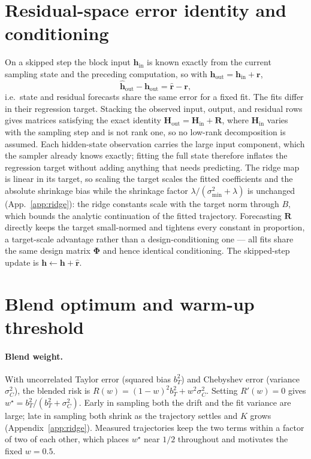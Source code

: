 \section{Residual-space error identity and conditioning}
\label{app:residual}

On a skipped step the block input $\mathbf{h}_{\mathrm{in}}$ is known
exactly from the current sampling state and the preceding computation,
so with $\mathbf{h}_{\mathrm{out}} = \mathbf{h}_{\mathrm{in}} + \mathbf{r}$,
\begin{equation}
  \hat{\mathbf{h}}_{\mathrm{out}} - \mathbf{h}_{\mathrm{out}}
  = \hat{\mathbf{r}} - \mathbf{r},
\end{equation}
i.e.\ state and residual forecasts share the same error for a fixed fit.
The fits differ in their regression target. Stacking the observed
input, output, and residual rows gives matrices satisfying the exact
identity $\mathbf{H}_{\mathrm{out}} = \mathbf{H}_{\mathrm{in}} +
\mathbf{R}$, where $\mathbf{H}_{\mathrm{in}}$ varies with the sampling
step and is not rank one, so no low-rank decomposition is assumed.
Each hidden-state observation carries the large input component, which
the sampler already knows exactly; fitting the full state therefore
inflates the regression target without adding anything that needs
predicting. The ridge map is linear in its target, so scaling the
target scales the fitted coefficients and the absolute shrinkage bias
while the shrinkage factor $\lambda/(\sigma_{\min}^2 + \lambda)$ is
unchanged (App.~\ref{app:ridge}): the ridge constants scale with the
target norm through $B$, which bounds the analytic continuation of the
fitted trajectory. Forecasting $\mathbf{R}$ directly keeps the target
small-normed and tightens every constant in proportion, a
target-scale advantage rather than a design-conditioning one --- all
fits share the same design matrix $\mathbf{\Phi}$ and hence identical
conditioning. The skipped-step update is $\mathbf{h} \gets
\mathbf{h} + \hat{\mathbf{r}}$.

\section{Blend optimum and warm-up threshold}
\label{app:blend}

\paragraph{Blend weight.} With uncorrelated Taylor error (squared bias
$b_T^2$) and Chebyshev error (variance $\sigma_C^2$), the blended risk is
$R(w) = (1-w)^2 b_T^2 + w^2\sigma_C^2$. Setting $R'(w) = 0$ gives
$w^\star = b_T^2/(b_T^2 + \sigma_C^2)$. Early in sampling both the drift
and the fit variance are large; late in sampling both shrink as the
trajectory settles and $K$ grows (Appendix~\ref{app:ridge}).
Measured trajectories keep the two terms within a factor of two of each
other, which places $w^\star$ near $1/2$ throughout and motivates the
fixed $w = 0.5$.

